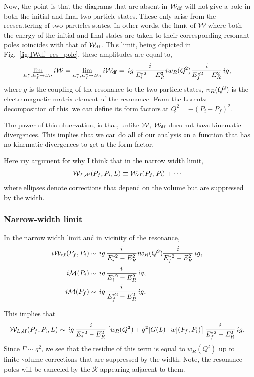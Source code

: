 Now, the point is that the diagrams that are absent in ${\mathcal{W}}_{\rm df}$ will not give a pole in both the initial and final two-particle states. These only arise from the reescattering of two-particles states. In other words, the limit of ${\mathcal{W}}$ where both the energy of the initial and final states are taken to their corresponding resonant poles coincides with that of ${\mathcal{W}}_{\rm df}$. This limit, being depicted in Fig.~\ref{fig:IWdf_res_pole}, these amplitudes are equal to,
\begin{align}
\lim_{E_i^\star,E_f^\star\to E_R}i{\mathcal{W}}=\lim_{E_i^\star,E_f^\star\to E_R}i{\mathcal{W}}_{\rm df}=
 \,{ig}\,\frac{i}{E_i^{*2}-E_R^2} iw_R(Q^2)\frac{i}{E_f^{*2}-E_R^2}\,{ig},
\end{align}
where $g$ is the coupling of the resonance to the two-particle states, $w_R(Q^2)$ is the electromagnetic matrix element of the resonance. From the Lorentz decomposition of this, we can define its form factors at $Q^2=-(P_i-P_f)^2$. 

The power of this observation, is that, unlike ${\mathcal{W}}$, ${\mathcal{W}}_{\rm df}$ does not have kinematic divergences. This implies that we can do all of our analysis on a function that has no kinematic divergences to get a the form factor. 



 Here my argument for why I think that in the narrow width limit, 
\begin{align}
 {\mathcal{W}}_{L,{\rm df}}(P_f,P_i,L)  \equiv {\mathcal{W}}_{\rm df}(P_f,P_i)+\cdots
\end{align}
where ellipses denote corrections that depend on the volume but are suppressed by the width. 

 \subsubsection{Narrow-width limit}

In the narrow width limit and in vicinity of the resonance, 
\begin{align}
i{\mathcal{W}}_{\rm df}(P_f,P_i)
&\sim
 \,{ig}\,\frac{i}{E_i^{*2}-E_R^2} iw_R(Q^2)\frac{i}{E_f^{*2}-E_R^2}\,{ig},\\
 i\mathcal M(P_i) 
&\sim
 \,{ig}\,\frac{i}{E_i^{*2}-E_R^2} \,{ig},
\\
i \mathcal M(P_f) 
&\sim
 \,{ig}\,\frac{i}{E_f^{*2}-E_R^2}\,{ig},
\end{align}

This implies that 
 \begin{equation}
\label{eq:WtiltoWdf}
 {\mathcal{W}}_{L,{\rm df}}(P_f,P_i,L)  \sim
  \,{ig}\,\frac{i}{E_i^{*2}-E_R^2} \left[ w_R(Q^2)+g^2[G(L) \cdot w](P_f,P_i)\right]\frac{i}{E_f^{*2}-E_R^2}\,{ig}.\\
 \end{equation}
 Since $\Gamma\sim g^2$, we see that the residue of this term is equal to $w_R(Q^2)$ up to finite-volume corrections that are suppressed by the width. Note, the resonance poles will be canceled by the $\mathcal{R}$ appearing adjacent to them.
 
